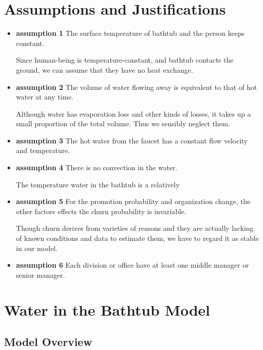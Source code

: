 \documentclass[12pt,a4paper,titlepage]{article}
\begin{document}
\section{Assumptions and Justifications}
\label{sec:assumptions-and-justifications}

\begin{itemize}
\item \textbf{assumption 1} The surface temperature of bathtub and the person keeps constant.
    
    Since human-being is temperature-constant, and bathtub contacts the ground, we can assume that they have no heat exchange.
    
\item \textbf{assumption 2} The volume of water flowing away is equivalent to that of hot water at any time.
    
    Although water has evaporation loss and other kinds of losses,  it takes up a small proportion of the total volume. Thus we sensibly neglect them.
    
\item \textbf{assumption 3} The hot water from the faucet has a constant flow velocity and temperature.

\item \textbf{assumption 4} There is no convection in the water. 

The temperature water in the bathtub is a relatively 


\item \textbf{assumption 5} For the promotion probability and
  organization change, the other factors effects the churn probability
  is invariable.

Though churn derives from varieties of reasons and they are actually
lacking of known conditions and data to estimate them, we have to
regard it as stable in our model.

\item \textbf{assumption 6} Each division or office have at least one
  middle manager or senior manager.

\end{itemize}

\section{Water in the Bathtub Model}
\label{sec:human-capital-model}


\subsection{Model Overview}
\label{sec:model-overview}
\end{document}
